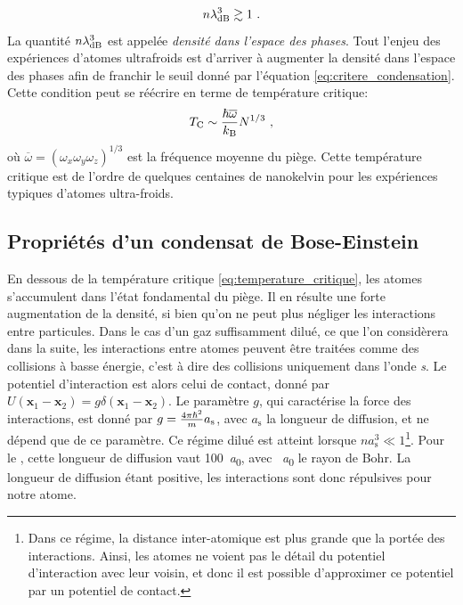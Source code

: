 \begin{equation}
n \lambda_{\mathrm{dB}}^3 \gtrsim 1 \text{ .}
\label{eq:critere_condensation}
\end{equation}
La quantité $n \lambda_{\mathrm{dB}}^3$ est appelée \emph{densité dans l'espace des phases}. Tout l'enjeu des expériences d'atomes ultrafroids est d'arriver à augmenter la densité dans l'espace des phases afin de franchir le seuil donné par l'équation \ref{eq:critere_condensation}. Cette condition peut se réécrire en terme de température critique:
\begin{equation}
T_{\mathrm{C}}\sim \frac{\hslash \overline{\omega}}{k_{\mathrm{B}}}N^{1/3} \text{ ,}
\label{eq:temperature_critique}
\end{equation}
où $\overline{\omega}=(\omega_x \omega_y \omega_z)^{1/3}$ est la fréquence moyenne du piège. Cette température critique est de l'ordre de quelques centaines de nanokelvin pour les expériences typiques d'atomes ultra-froids.





\subsection{Propriétés d'un condensat de Bose-Einstein}
\label{sc:propriete_BEC}
En dessous de la température critique \ref{eq:temperature_critique}, les atomes s'accumulent dans l'état fondamental du piège. Il en résulte une forte augmentation de la densité, si bien qu'on ne peut plus négliger les interactions entre particules. Dans le cas d'un gaz suffisamment dilué, ce que l'on considèrera dans la suite, les interactions entre atomes peuvent être traitées comme des collisions à basse énergie, c'est à dire des collisions uniquement dans l'onde \emph{s}. Le potentiel d'interaction est alors celui de contact, donné par $U(\mathbf{x}_1-\mathbf{x}_2)=g\delta(\mathbf{x}_1-\mathbf{x}_2)$. Le paramètre $g$, qui caractérise la force des interactions, est donné par $g=\frac{4 \pi \hslash^2}{m}a_{\mathrm{s}}$, avec $a_{\mathrm{s}}$ la longueur de diffusion, et ne dépend que de ce paramètre. Ce régime dilué est atteint lorsque $na_{\mathrm{s}}^3\ll 1$\footnote{Dans ce régime, la distance inter-atomique est plus grande que la portée des interactions. Ainsi, les atomes ne voient pas le détail du potentiel d'interaction avec leur voisin, et donc il est possible d'approximer ce potentiel par un potentiel de contact.}. Pour le , cette longueur de diffusion vaut \SI{100}{\bohr}, avec \SI{}{\bohr} le rayon de Bohr. La longueur de diffusion étant positive, les interactions sont donc répulsives pour notre atome.

